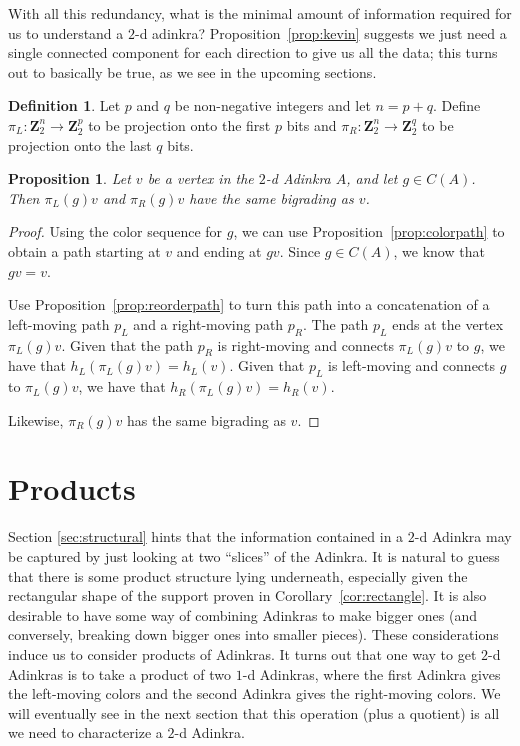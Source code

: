\documentclass[12pt,twoside,singlespace]{article}
\numberwithin{equation}{section}
\newtheorem{prop}[equation]{Proposition}
\theoremstyle{definition}
\newtheorem{definition}[equation]{Definition}
\newcommand{\ZZ}{\mathbf{Z}}
\begin{document}
With all this redundancy, what is the minimal amount of information required for us to understand a $2$-d adinkra? Proposition~\ref{prop:kevin} suggests we just need a single connected component for each direction to give us all the data; this turns out to basically be true, as we see in the upcoming sections.

\begin{definition}
Let $p$ and $q$ be non-negative integers and let $n=p+q$.  Define $\pi_L:\ZZ_2^n\to\ZZ_2^p$ to be projection onto the first $p$ bits and $\pi_R:\ZZ_2^n\to\ZZ_2^q$ to be projection onto the last $q$ bits.
\end{definition}

\begin{prop}
\label{prop:heightcode}
Let $v$ be a vertex in the $2$-d Adinkra $A$, and let $g\in C(A)$.  Then $\pi_L(g)v$ and $\pi_R(g)v$ have the same bigrading as $v$.
\end{prop}

\begin{proof}
Using the color sequence for $g$, we can use Proposition~\ref{prop:colorpath} to obtain a path starting at $v$ and ending at $gv$.  Since $g\in C(A)$, we know that $gv=v$.

Use Proposition~\ref{prop:reorderpath} to turn this path into a concatenation of a left-moving path $p_L$ and a right-moving path $p_R$.  The path $p_L$ ends at the vertex $\pi_L(g)v$.  Given that the path $p_R$ is right-moving and connects $\pi_L(g)v$ to $g$, we have that $h_L(\pi_L(g)v)=h_L(v)$.  Given that $p_L$ is left-moving and connects $g$ to $\pi_L(g)v$, we have that $h_R(\pi_L(g)v)=h_R(v)$.

Likewise, $\pi_R(g)v$ has the same bigrading as $v$.


\end{proof}


\section{Products}
\label{sec:products}

Section \ref{sec:structural} hints that the information contained in a $2$-d Adinkra may be captured by just looking at two ``slices'' of the Adinkra. It is natural to guess that there is some product structure lying underneath, especially given the rectangular shape of the support proven in Corollary~\ref{cor:rectangle}. It is also desirable to have some way of combining Adinkras to make bigger ones (and conversely, breaking down bigger ones into smaller pieces). These considerations induce us to consider products of Adinkras. It turns out that one way to get $2$-d Adinkras is to take a product of two $1$-d Adinkras, where the first Adinkra gives the left-moving colors and the second Adinkra gives the right-moving colors. We will eventually see in the next section that this operation (plus a quotient) is all we need to characterize a $2$-d Adinkra.
\end{document}
